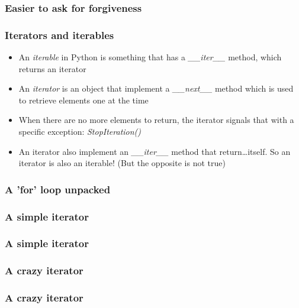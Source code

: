 \documentclass[9pt]{beamer}
\begin{document}
\begin{frame}
  \frametitle{Easier to ask for forgiveness}
  
\end{frame}


\begin{frame}
  \frametitle{Iterators and iterables}
  
  \begin{itemize}
    \item An \emph{iterable} in Python is something that has a \emph{\_\_iter\_\_}
          method, which returns an \alert{iterator}
    \medskip
    \item An \emph{iterator} is an object that implement a \emph{\_\_next\_\_} method
          which is used to retrieve elements one at the time
    \medskip
    \item When there are no more elements to return, the iterator signals that with a specific
          exception: \emph{StopIteration()}
    \medskip
    \item An iterator also implement an \emph{\_\_iter\_\_} method that return\dots itself.
          So an iterator is also an iterable! (But the opposite is not true)
  \end{itemize}
  
\end{frame}


\begin{frame}
  \frametitle{A 'for' loop unpacked}
  
\end{frame}



\begin{frame}
  \frametitle{A simple iterator}
  
\end{frame}


\begin{frame}
  \frametitle{A simple iterator}
  
\end{frame}


\begin{frame}
  \frametitle{A crazy iterator}
  
\end{frame}


\begin{frame}
  \frametitle{A crazy iterator}
  
\end{frame}
\end{document}
